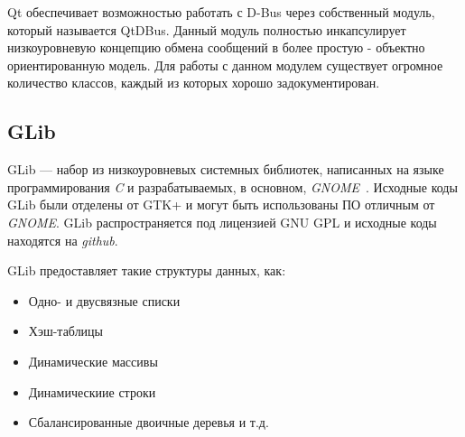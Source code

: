 Qt обеспечивает возможностью работать с D-Bus через собственный модуль, который называется QtDBus. Данный модуль полностью инкапсулирует низкоуровневую концепцию обмена сообщений в более простую - объектно ориентированную модель. Для работы с данном модулем существует огромное количество классов, каждый из которых хорошо задокументирован.

\subsection{GLib}
GLib --- набор из низкоуровневых системных библиотек, написанных на языке программирования \textit{C} и разрабатываемых, в основном, \textit{GNOME}~\cite{gnome}. Исходные коды GLib были отделены от GTK+ и могут быть использованы ПО отличным от \textit{GNOME}. GLib распространяется под лицензией GNU GPL и исходные коды находятся на \textit{github}.

GLib предоставляет такие структуры данных, как:
\begin{itemize}
\item Одно- и двусвязные списки
\item Хэш-таблицы
\item Динамические массивы
\item Динамическиие строки
\item Сбалансированные двоичные деревья и т.д.
\end{itemize}

